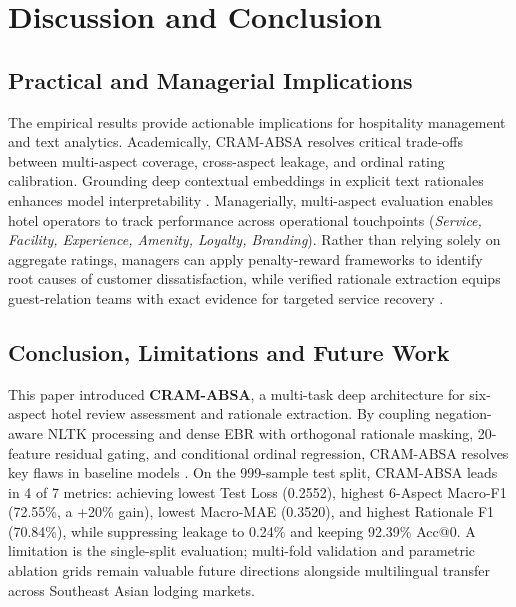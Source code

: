 \documentclass{llncs}
\begin{document}
\section{Discussion and Conclusion}
\label{sec:discussion_conclusion}

\subsection{Practical and Managerial Implications}
\label{subsec:discussion_implications}
The empirical results provide actionable implications for hospitality management and text analytics. Academically, CRAM-ABSA resolves critical trade-offs between multi-aspect coverage, cross-aspect leakage, and ordinal rating calibration. Grounding deep contextual embeddings in explicit text rationales enhances model interpretability \cite{ref16_shin2024}. Managerially, multi-aspect evaluation enables hotel operators to track performance across operational touchpoints (\textit{Service, Facility, Experience, Amenity, Loyalty, Branding}). Rather than relying solely on aggregate ratings, managers can apply penalty-reward frameworks \cite{ref13_zhang2022} to identify root causes of customer dissatisfaction, while verified rationale extraction equips guest-relation teams with exact evidence for targeted service recovery \cite{ref15_pang2025}.

\subsection{Conclusion, Limitations and Future Work}
\label{subsec:conclusion_future_work}
This paper introduced \textbf{CRAM-ABSA}, a multi-task deep architecture for six-aspect hotel review assessment and rationale extraction. By coupling negation-aware NLTK processing and dense EBR with orthogonal rationale masking, 20-feature residual gating, and conditional ordinal regression, CRAM-ABSA resolves key flaws in baseline models \cite{ref01_bimaputra2023,ref04_namee2023,ref09_nadeem2025}. On the 999-sample test split, CRAM-ABSA leads in 4 of 7 metrics: achieving lowest Test Loss (0.2552), highest 6-Aspect Macro-F1 (72.55\%, a +20\% gain), lowest Macro-MAE (0.3520), and highest Rationale F1 (70.84\%), while suppressing leakage to 0.24\% and keeping 92.39\% Acc@0. A limitation is the single-split evaluation; multi-fold validation and parametric ablation grids remain valuable future directions alongside multilingual transfer across Southeast Asian lodging markets.
\end{document}
